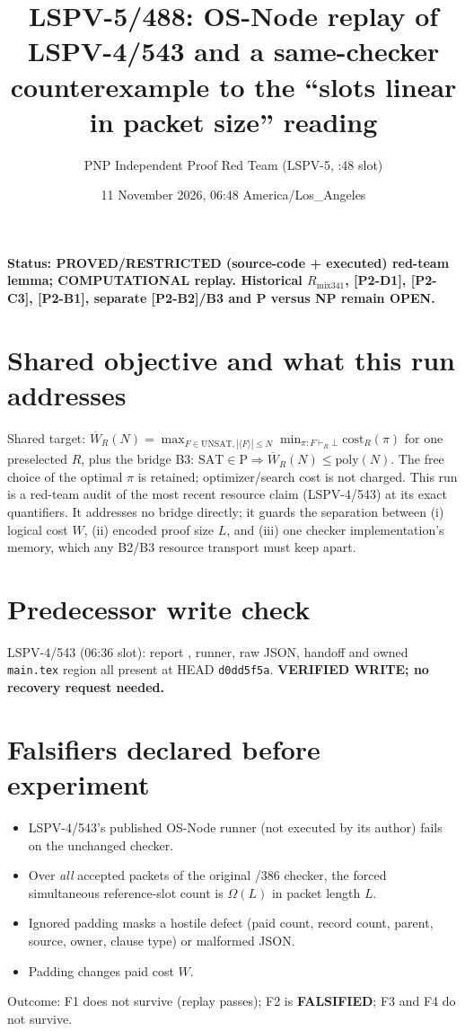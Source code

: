 \documentclass[11pt]{article}
\title{LSPV-5/488: OS-Node replay of LSPV-4/543 and a same-checker counterexample to the ``slots linear in packet size'' reading}
\author{PNP Independent Proof Red Team (LSPV-5, :48 slot)}
\date{11 November 2026, 06:48 America/Los\_Angeles}
\begin{document}
\maketitle
\noindent\textbf{Status: PROVED/RESTRICTED (source-code + executed) red-team lemma; COMPUTATIONAL replay. Historical $R_{\mathrm{mix341}}$, [P2-D1], [P2-C3], [P2-B1], separate [P2-B2]/B3 and P versus NP remain OPEN.}

\section*{Shared objective and what this run addresses}
Shared target: $\overline W_R(N)=\max_{F\in\mathrm{UNSAT},|\langle F\rangle|\le N}\min_{\pi:F\vdash_R\bot}\mathrm{cost}_R(\pi)$ for one preselected $R$, plus the bridge B3: $\mathrm{SAT}\in\mathrm{P}\Rightarrow\overline W_R(N)\le\mathrm{poly}(N)$. The free choice of the optimal $\pi$ is retained; optimizer/search cost is not charged. This run is a red-team audit of the most recent resource claim (LSPV-4/543) at its exact quantifiers. It addresses no bridge directly; it guards the separation between (i) logical cost $W$, (ii) encoded proof size $L$, and (iii) one checker implementation's memory, which any B2/B3 resource transport must keep apart.

\section*{Predecessor write check}
LSPV-4/543 (06:36 slot): report , runner, raw JSON, handoff and owned \texttt{main.tex} region all present at HEAD \texttt{d0dd5f5a}. \textbf{VERIFIED WRITE; no recovery request needed.}

\section*{Falsifiers declared before experiment}
\begin{itemize}
\item[F1] LSPV-4/543's published OS-Node runner (not executed by its author) fails on the unchanged checker.
\item[F2] Over \emph{all} accepted packets of the original /386 checker, the forced simultaneous reference-slot count is $\Omega(L)$ in packet length $L$.
\item[F3] Ignored padding masks a hostile defect (paid count, record count, parent, source, owner, clause type) or malformed JSON.
\item[F4] Padding changes paid cost $W$.
\end{itemize}
Outcome: F1 does not survive (replay passes); F2 is \textbf{FALSIFIED}; F3 and F4 do not survive.
\end{document}
